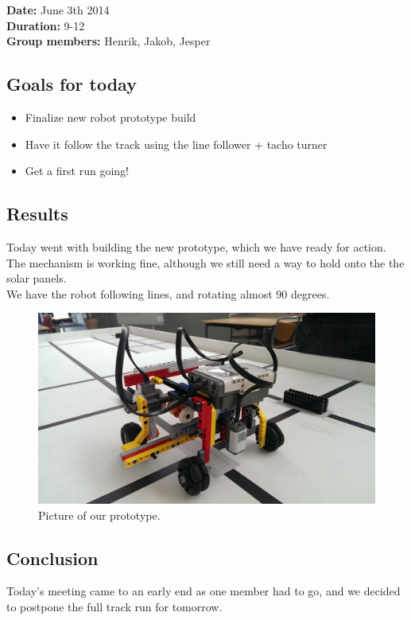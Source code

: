 \textbf{Date:} June 3th 2014\\\textbf{Duration:} 9-12\\\textbf{Group
members:} Henrik, Jakob, Jesper

\subsection{Goals for today}

\begin{itemize}
\itemsep1pt\parskip0pt
\item
  Finalize new robot prototype build
\item
  Have it follow the track using the line follower + tacho turner
\item
  Get a first run going!
\end{itemize}

\subsection{Results}

Today went with building the new prototype, which we have ready for
action. The mechanism is working fine, although we still need a way to
hold onto the the solar panels.\\We have the robot following lines, and
rotating almost 90 degrees.
\begin{figure}[hbt]
  \centering
  \includegraphics[scale=0.1]{../experiments/images/simplePrototype.jpg}
\caption{Picture of our prototype.}
\end{figure}
\subsection{Conclusion}

Today's meeting came to an early end as one member had to go, and we
decided to postpone the full track run for tomorrow.
